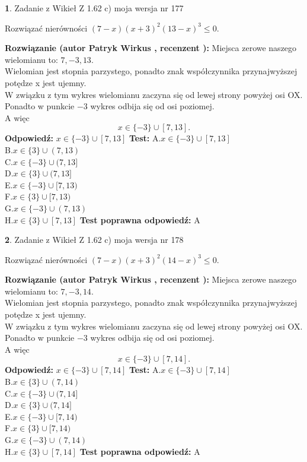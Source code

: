 \documentclass[12pt, a4paper]{article}
\theoremstyle{definition} %
\newtheorem{zad}{}
\newcommand{\zadStart}[1]{\begin{zad}#1\newline}
\newcommand{\zadStop}{\end{zad}}
\newcommand{\rozwStart}[2]{\noindent \textbf{Rozwiązanie (autor #1 , recenzent #2): }\newline}
\newcommand{\rozwStop}{\newline}
\newcommand{\odpStart}{\noindent \textbf{Odpowiedź:}\newline}
\newcommand{\odpStop}{\newline}
\newcommand{\testStart}{\noindent \textbf{Test:}\newline}
\newcommand{\testStop}{\newline}
\newcommand{\kluczStart}{\noindent \textbf{Test poprawna odpowiedź:}\newline}
\newcommand{\kluczStop}{\newline}
\begin{document}
\zadStart{Zadanie z Wikieł Z 1.62 c) moja wersja nr 177}

Rozwiązać nierówności $(7-x)(x+3)^{2}(13-x)^{3}\le0$.
\zadStop
\rozwStart{Patryk Wirkus}{}
Miejsca zerowe naszego wielomianu to: $7, -3, 13$.\\
Wielomian jest stopnia parzystego, ponadto znak współczynnika przy\linebreak najwyższej potędze x jest ujemny.\\ W związku z tym wykres wielomianu zaczyna się od lewej strony powyżej osi OX.\\
Ponadto w punkcie $-3$ wykres odbija się od osi poziomej.\\
A więc $$x \in \{-3\} \cup [7,13].$$
\rozwStop
\odpStart
$x \in \{-3\} \cup [7,13]$
\odpStop
\testStart
A.$x \in \{-3\} \cup [7,13]$\\
B.$x \in \{3\} \cup (7,13)$\\
C.$x \in \{-3\} \cup (7,13]$\\
D.$x \in \{3\} \cup (7,13]$\\
E.$x \in \{-3\} \cup [7,13)$\\
F.$x \in \{3\} \cup [7,13)$\\
G.$x \in \{-3\} \cup (7,13)$\\
H.$x \in \{3\} \cup [7,13]$
\testStop
\kluczStart
A
\kluczStop



\zadStart{Zadanie z Wikieł Z 1.62 c) moja wersja nr 178}

Rozwiązać nierówności $(7-x)(x+3)^{2}(14-x)^{3}\le0$.
\zadStop
\rozwStart{Patryk Wirkus}{}
Miejsca zerowe naszego wielomianu to: $7, -3, 14$.\\
Wielomian jest stopnia parzystego, ponadto znak współczynnika przy\linebreak najwyższej potędze x jest ujemny.\\ W związku z tym wykres wielomianu zaczyna się od lewej strony powyżej osi OX.\\
Ponadto w punkcie $-3$ wykres odbija się od osi poziomej.\\
A więc $$x \in \{-3\} \cup [7,14].$$
\rozwStop
\odpStart
$x \in \{-3\} \cup [7,14]$
\odpStop
\testStart
A.$x \in \{-3\} \cup [7,14]$\\
B.$x \in \{3\} \cup (7,14)$\\
C.$x \in \{-3\} \cup (7,14]$\\
D.$x \in \{3\} \cup (7,14]$\\
E.$x \in \{-3\} \cup [7,14)$\\
F.$x \in \{3\} \cup [7,14)$\\
G.$x \in \{-3\} \cup (7,14)$\\
H.$x \in \{3\} \cup [7,14]$
\testStop
\kluczStart
A
\kluczStop
\end{document}
